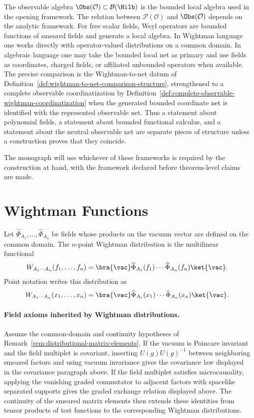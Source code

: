 The observable algebra \(\Obs(\mathcal O)\subset\mathcal B(\Hilb)\) is the
bounded local algebra used in the opening framework. The relation between
\(\mathcal P(\mathcal O)\) and \(\Obs(\mathcal O)\) depends on the analytic
framework. For free scalar fields, Weyl operators are bounded functions of
smeared fields and generate a local algebra. In Wightman language one works
directly with operator-valued distributions on a common domain. In algebraic
language one may take the bounded local net as primary and use fields as
coordinates, charged fields, or affiliated unbounded operators when available.
The precise comparison is the Wightman-to-net datum of
Definition~\ref{def:wightman-to-net-comparison-structure}, strengthened to a
complete observable coordinatization by
Definition~\ref{def:complete-observable-wightman-coordinatization} when the
generated bounded coordinate net is identified with the represented
observable net.  Thus a statement about polynomial fields, a statement about
bounded functional calculus, and a statement about the neutral observable net
are separate pieces of structure unless a construction proves that they
coincide.

The monograph will use whichever of these frameworks is required by the
construction at hand, with the framework declared before theorem-level claims
are made.

\section{Wightman Functions}

\begin{definition}
\label{def:wightman-distribution-field-multiplet}
Let \(\widehat\Phi_{A_1},\ldots,\widehat\Phi_{A_n}\) be fields whose products
on the vacuum vector are defined on the common domain. The \(n\)-point
Wightman distribution is the multilinear functional
\[
  W_{A_1\cdots A_n}(f_1,\ldots,f_n)
  =
  \bra{\vac}
  \widehat\Phi_{A_1}(f_1)\cdots
  \widehat\Phi_{A_n}(f_n)
  \ket{\vac}.
\]
Point notation writes this distribution as
\[
  W_{A_1\cdots A_n}(x_1,\ldots,x_n)
  =
  \bra{\vac}
  \widehat\Phi_{A_1}(x_1)\cdots
  \widehat\Phi_{A_n}(x_n)
  \ket{\vac}.
\]
\end{definition}

\paragraph{Field axioms inherited by Wightman distributions.}
Assume the common-domain and continuity hypotheses of
Remark~\ref{rem:distributional-matrix-elements}.  If the vacuum is
Poincare invariant and the field multiplet is covariant, inserting
\(U(g)U(g)^{-1}\) between neighboring smeared factors and using vacuum
invariance gives the covariance law displayed in the covariance paragraph
above.  If the
field multiplet satisfies microcausality, applying the vanishing graded
commutator to adjacent factors with spacelike separated supports gives the
graded exchange relation displayed above.  The continuity of the smeared
matrix elements then extends these identities from tensor products of test
functions to the corresponding Wightman distributions.


